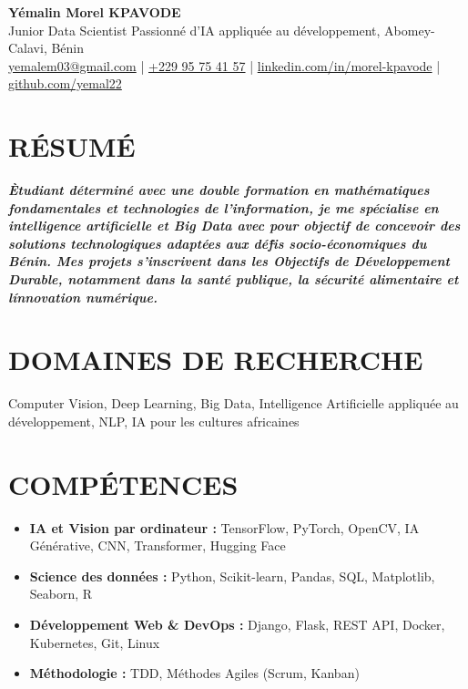 \documentclass[a4paper,9pt]{extarticle}
\begin{document}
\begin{flushleft}
\textbf{\LARGE Y\'emalin Morel KPAVODE}\\[2pt]
Junior Data Scientist \textendash{} Passionn\'e d\textquoteright{}IA appliqu\'ee au d\'eveloppement, Abomey-Calavi, B\'enin\\
\href{mailto:yemalem03@gmail.com}{yemalem03@gmail.com} | \href{tel:+22995754157}{+229 95 75 41 57} | \href{https://www.linkedin.com/in/morel-kpavode}{linkedin.com/in/morel-kpavode} | \href{https://github.com/yemal22}{github.com/yemal22}
\end{flushleft}

\section*{R\'ESUM\'E}
\noindent
\textit{\small\textbf{\textsf{\`{E}tudiant d\'etermin\'e avec une double formation en math\'ematiques fondamentales et technologies de l'information, je me sp\'ecialise en intelligence artificielle et Big Data avec pour objectif de concevoir des solutions technologiques adapt\'ees aux d\'e\'fis socio-\'economiques du B\'enin. Mes projets s\textquoteright{}inscrivent dans les Objectifs de D\'eveloppement Durable, notamment dans la sant\'e publique, la s\'ecurit\'e alimentaire et l\'innovation num\'erique.}}}

\section*{DOMAINES DE RECHERCHE}
Computer Vision, Deep Learning, Big Data, Intelligence Artificielle appliqu\'ee au d\'eveloppement, NLP, IA pour les cultures africaines

\section*{COMP\'ETENCES}
\begin{itemize}
    \item \textbf{IA et Vision par ordinateur :} TensorFlow, PyTorch, OpenCV, IA G\'en\'erative, CNN, Transformer, Hugging Face
    \item \textbf{Science des donn\'ees :} Python, Scikit-learn, Pandas, SQL, Matplotlib, Seaborn, R
    \item \textbf{D\'eveloppement Web & DevOps :} Django, Flask, REST API, Docker, Kubernetes, Git, Linux
    \item \textbf{M\'ethodologie :} TDD, M\'ethodes Agiles (Scrum, Kanban)
\end{itemize}
\end{document}
